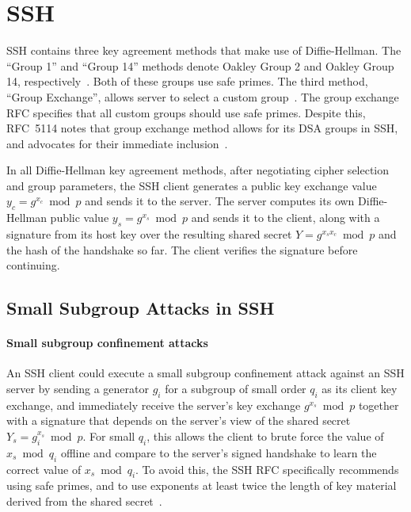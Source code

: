 
\section{SSH}

SSH contains three key agreement methods that make use of Diffie-Hellman. The
``Group 1'' and ``Group 14'' methods denote Oakley Group 2 and Oakley Group
14, respectively~\cite{rfc4253}. Both of these groups use safe primes. The
third method, ``Group Exchange'', allows server to select a custom
group~\cite{rfc4419}. The group exchange RFC specifies that all custom groups
should use safe primes. Despite this, RFC~5114 notes that group exchange method
allows for its DSA groups in SSH, and advocates for their immediate
inclusion~\cite{rfc5114}.

In all Diffie-Hellman key agreement methods, after negotiating cipher selection and group parameters, 
the SSH client generates a public
key exchange value $y_c = g^{x_c} \bmod p$ and sends it to the server. The
server computes its own Diffie-Hellman public value $y_s = g^{x_s} \bmod p$ and
sends it to the client, along with a signature from its host key over the
resulting shared secret $Y = g^{x_s x_c} \bmod p$ and the hash of the handshake
so far.  The client verifies the signature before continuing.

\subsection{Small Subgroup Attacks in SSH}

\paragraph{Small subgroup confinement attacks}
An SSH client could execute a small subgroup confinement attack against an SSH
server by sending a generator $g_i$ for a subgroup of small order $q_i$ as its
client key exchange, and immediately receive the server's key exchange $g^{x_s}
\bmod p$ together with a signature that depends on the server's view of the
shared secret $Y_s = g_i^{x_s} \bmod p$. For small $q_i$, this allows the
client to brute force the value of $x_s \bmod q_i$ offline and compare to the
server's signed handshake to learn the correct value of $x_s \bmod q_i$. To
avoid this, the SSH RFC specifically recommends using safe primes, and to use
exponents at least twice the length of key material derived from the shared
secret~\cite{rfc4419}. 

